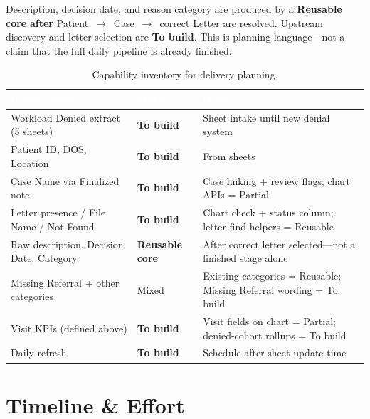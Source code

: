 \documentclass[11pt,a4paper]{article}
\newcommand{\statusReuse}{\textcolor{SuccessGreen}{\textbf{Reusable core}}}
\newcommand{\statusBuild}{\textcolor{DangerRed}{\textbf{To build}}}
\begin{document}
\begin{tcolorbox}[rulebox,title={Delivery note for planning}]
Description, decision date, and reason category are produced by a \statusReuse{}
\textbf{after} Patient~$\rightarrow$~Case~$\rightarrow$~correct Letter are resolved.
Upstream discovery and letter selection are \statusBuild{}. This is planning language---not
a claim that the full daily pipeline is already finished.
\end{tcolorbox}

\begin{table}[h!]
\centering
\renewcommand{\arraystretch}{1.2}
\begin{tabularx}{\linewidth}{L{4.6cm} L{2.6cm} X}
\toprule
{}
\textcolor{white}{\bfseries Requirement} &
\textcolor{white}{\bfseries Status} &
\textcolor{white}{\bfseries Notes} \\
\midrule
Workload Denied extract (5 sheets) &
\statusBuild{} &
Sheet intake until new denial system \\
Patient ID, DOS, Location &
\statusBuild{} &
From sheets \\
Case Name via Finalized note &
\statusBuild{} &
Case linking + review flags; chart APIs = Partial \\
Letter presence / File Name / Not Found &
\statusBuild{} &
Chart check + status column; letter-find helpers = Reusable \\
Raw description, Decision Date, Category &
\statusReuse{} &
After correct letter selected---not a finished stage alone \\
Missing Referral + other categories &
Mixed &
Existing categories = Reusable; Missing Referral wording = To build \\
Visit KPIs (defined above) &
\statusBuild{} &
Visit fields on chart = Partial; denied-cohort rollups = To build \\
Daily refresh &
\statusBuild{} &
Schedule after sheet update time \\
\bottomrule
\end{tabularx}
\caption{Capability inventory for delivery planning.}
\end{table}


\section{Timeline \& Effort}
\end{document}
